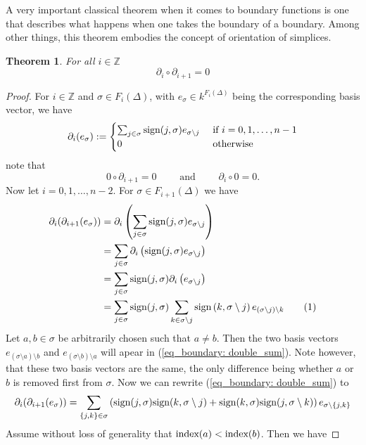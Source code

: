 \documentclass[11pt,a4paper,twoside, openright]{report}
\newtheorem{mythm}{Theorem}[chapter]
\newcommand\numberthis{\addtocounter{equation}{1}\tag{\theequation}}
\begin{document}
A very important classical theorem when it comes to boundary functions is one that describes what happens when one takes the boundary of a boundary. Among other things, this theorem embodies the concept of orientation of simplices.
\begin{mythm}\label{thm:boundary}
For all $i\in\mathbb{Z}$ 
\begin{equation*}
\partial_i\circ\partial_{i+1}=0
\end{equation*}
\end{mythm}
\begin{proof}
For $i\in\mathbb{Z}$ and $\sigma\in F_i(\Delta)$, with $e_\sigma\in k^{F_i(\Delta)}$ being the corresponding basis vector, we have 
\begin{equation*}
\partial_i(e_\sigma):=
\begin{cases}
\sum_{j\in\sigma}\textnormal{sign}(j,\sigma)e_{\sigma\setminus j} & \textnormal{ if } i=0,1,\dots,n-1 \\
0 & \textnormal{ otherwise}
\end{cases}
\end{equation*}
note that 
\begin{equation*}
0\circ\partial_{i+1}=0 \qquad \text{ and } \qquad \partial_i\circ 0 = 0.
\end{equation*}
Now let $i=0,1,\dots,n-2$. For $\sigma\in F_{i+1}(\Delta)$ we have
\begin{align*}
\partial_i(\partial_{i+1}(e_\sigma))&=\partial_i\left(\sum_{j\in\sigma}\textnormal{sign}(j,\sigma)e_{\sigma\setminus j}\right) \\
&=\sum_{j\in\sigma}\partial_i\left(\textnormal{sign}(j,\sigma)e_{\sigma\setminus j}\right)\\
&=\sum_{j\in\sigma}\textnormal{sign}(j,\sigma)\partial_i\left(e_{\sigma\setminus j}\right)\\
&=\sum_{j\in\sigma}\textnormal{sign}(j,\sigma)\sum_{k\in\sigma\setminus j}\textnormal{sign}\left(k,\sigma\setminus j\right)e_{(\sigma\setminus j)\setminus k}\numberthis \label{eq_boundary: double_sum}\\
\end{align*}
Let $a,b\in\sigma$ be arbitrarily chosen such that $a\not=b$. Then the two basis vectors $e_{(\sigma\setminus a)\setminus b}$ and $e_{(\sigma\setminus b)\setminus a}$ will apear in (\ref{eq_boundary: double_sum}). Note however, that these two basis vectors are the same, the only difference being whether $a$ or $b$ is removed first from $\sigma$. Now we can rewrite (\ref{eq_boundary: double_sum}) to
\begin{equation}
\partial_i(\partial_{i+1}(e_\sigma))=\sum_{\{j,k\}\in\sigma}\left(\textnormal{sign}(j,\sigma)\textnormal{sign}(k,\sigma\setminus j) + \textnormal{sign}(k,\sigma)\textnormal{sign}(j,\sigma\setminus k)\right)e_{\sigma\setminus\{j,k\}} \label{eq_boundary: 0}
\end{equation}
Assume without loss of generality that $\textnormal{index}(a)<\textnormal{index}(b)$. Then we have 


\end{proof}
\end{document}
